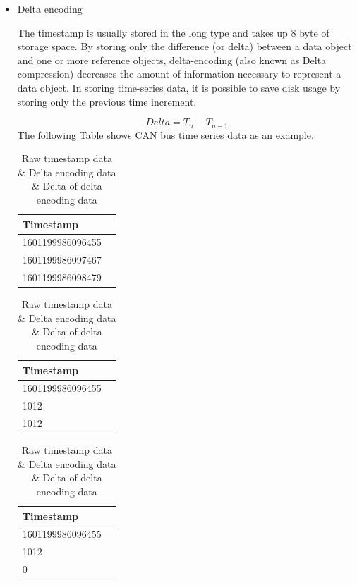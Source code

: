 \begin{itemize}
    \item Delta encoding
    
    The timestamp is usually stored in the long type and takes up 8 byte of storage space. By storing only the difference (or delta) between a data object and one or more reference objects, delta-encoding (also known as Delta compression) decreases the amount of information necessary to represent a data object. In storing time-series data, it is possible to save disk usage by storing only the previous time increment\cite{lockerman_2022}. 
    
    $$ Delta = T_n - T_{n-1} $$
    The following Table shows CAN bus time series data as an example.
    
    \begin{table}
            \footnotesize
                \begin{tabular}[t]{|p{3.2cm}|c|}
                    \hline
                    Timestamp\\ \hline
                    1601199986096455 \\ \hline
                    1601199986097467\\ \hline
                    1601199986098479 \\ \hline   
                \end{tabular}
                \hfill
                \begin{tabular}[t]{|p{3.2cm}|c|}
                    \hline
                    Timestamp\\ \hline
                    1601199986096455 \\ \hline
                    1012\\ \hline
                    1012 \\ \hline   
                \end{tabular}
                \hfill
                \begin{tabular}[t]{|p{3.2cm}|c|}
                    \hline
                    Timestamp\\ \hline
                    1601199986096455 \\ \hline
                    1012\\ \hline
                    0 \\ \hline   
                \end{tabular}
                \caption{Raw timestamp data \& Delta encoding data \& Delta-of-delta encoding data}
                \label{delta_delta}
            \end{table}
    

\end{itemize}
